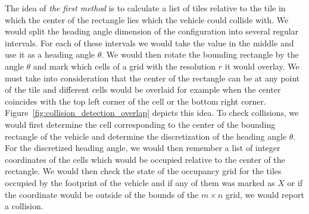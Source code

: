 The idea of \textit{the first method} is to calculate a list of tiles relative to the tile in which the center of the rectangle lies which the vehicle could collide with. We would split the heading angle dimension of the configuration into several regular intervals. For each of these intervals we would take the value in the middle and use it as a heading angle $\theta$. We would then rotate the bounding rectangle by the angle $\theta$ and mark which cells of a grid with the resolution $r$ it would overlay. We must take into consideration that the center of the rectangle can be at any point of the tile and different cells would be overlaid for example when the center coincides with the top left corner of the cell or the bottom right corner. Figure~\ref{fig:collision_detection_overlap} depicts this idea. To check collisions, we would first determine the cell corresponding to the center of the bounding rectangle of the vehicle and determine the discretization of the heading angle $\theta$. For the discretized heading angle, we would then remember a list of integer coordinates of the cells which would be occupied relative to the center of the rectangle. We would then check the state of the occupancy grid for the tiles occupied by the footprint of the vehicle and if any of them was marked as $X$ or if the coordinate would be outside of the bounds of the $m\times n$ grid, we would report a collision.

